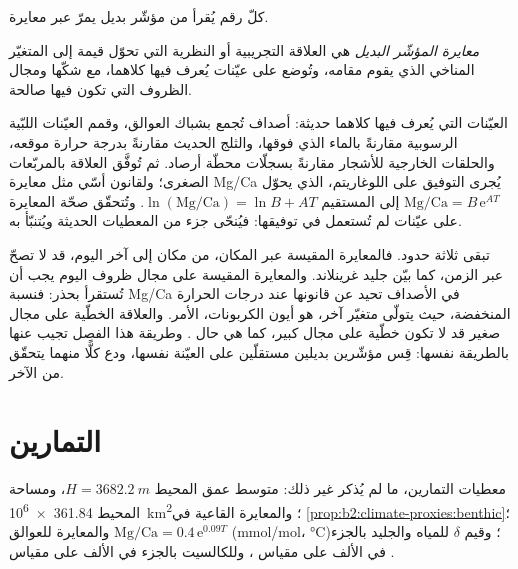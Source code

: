 كلّ رقم يُقرأ من مؤشّر بديل يمرّ عبر معايرة.

\begin{definition}\label{def:b2:climate-proxies:calibration}
\emph{معايرة المؤشّر البديل} هي العلاقة التجريبية أو النظرية التي
تحوّل قيمة  إلى المتغيّر المناخي الذي يقوم مقامه، وتُوضع على عيّنات
يُعرف فيها كلاهما، مع شكّها ومجال الظروف التي تكون فيها
صالحة.
\end{definition}

العيّنات التي يُعرف فيها كلاهما حديثة: أصداف تُجمع بشباك العوالق، وقمم العيّنات اللبّية الرسوبية مقارنةً بالماء الذي فوقها، والثلج الحديث مقارنةً بدرجة
حرارة موقعه، والحلقات الخارجية للأشجار مقارنةً بسجلّات محطّة أرصاد.
ثم تُوفَّق العلاقة بالمربّعات الصغرى؛ ولقانون أسّي مثل معايرة Mg/Ca
يُجرى التوفيق على اللوغاريتم، الذي يحوّل $\text{Mg/Ca} = B\,\mathrm{e}^{AT}$ إلى
المستقيم $\ln(\text{Mg/Ca}) = \ln B + AT$. وتُتحقّق صحّة المعايرة على عيّنات
لم تُستعمل في توفيقها: فيُنحّى جزء من المعطيات الحديثة ويُتنبّأ به.

تبقى ثلاثة حدود. فالمعايرة المقيسة عبر المكان، من مكان إلى آخر اليوم، قد لا تصحّ
عبر الزمن، كما بيّن جليد غرينلاند. والمعايرة المقيسة على مجال ظروف اليوم
يجب أن تُستقرأ بحذر: فنسبة Mg/Ca في الأصداف تحيد عن قانونها عند درجات الحرارة المنخفضة، حيث
يتولّى متغيّر آخر، هو أيون الكربونات، الأمر. والعلاقة الخطّية على مجال صغير
قد لا تكون خطّية على مجال كبير، كما هي حال . وطريقة هذا الفصل
تجيب عنها بالطريقة نفسها: قِس مؤشّرين بديلين مستقلّين على العيّنة نفسها، ودع كلًّا منهما
يتحقّق من الآخر.

\section*{التمارين}\label{sec:b2:climate-proxies:exercises}

معطيات التمارين، ما لم يُذكر غير ذلك: متوسط عمق المحيط $H = \qty{3682.2}{m}$، ومساحة
المحيط \qty{361.84e6}{km^2}؛ والمعايرة القاعية في \cref{prop:b2:climate-proxies:benthic}؛
والمعايرة للعوالق $\text{Mg/Ca} = 0.4\,\mathrm{e}^{0.09T}$ (\unit{mmol/mol}، \unit{\celsius})؛
وقيم $\delta$ للمياه والجليد بالجزء في الألف على مقياس ، وللكالسيت بالجزء في الألف على مقياس .

